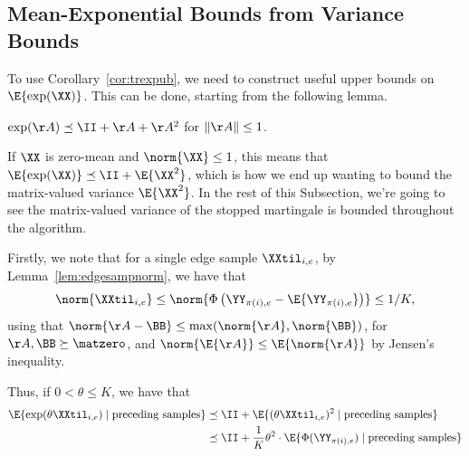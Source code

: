 
\subsection{Mean-Exponential Bounds from Variance Bounds}
To use Corollary~\ref{cor:trexpub}, we need to construct useful upper
bounds on $\E{\exp(\XX)}$.
This can be done, starting from the following lemma.
\begin{lemma}\label{lem:ineq_expagain}
  $\exp(\AA) \preceq \II + \AA + \AA^2$ for $\|\AA\|\leq1$.
\end{lemma}
If $\XX$ is zero-mean and $\norm{\XX} \leq 1$,
this means that $\E{\exp(\XX)} \preceq \II + \E{\XX^2}$,
which is how we end up wanting to bound the matrix-valued variance $\E{\XX^2}$.
In the rest of this Subsection, we're going to see the matrix-valued variance of the stopped
martingale is bounded throughout the algorithm.

Firstly, we note that for a single edge sample $\XXtil_{i,e}$,
by Lemma~\ref{lem:edgesampnorm}, we have that
\[
  \norm{\XXtil_{i,e}} \leq
  \norm{\Phi\left( \YY_{\pi(i),e} - \E{\YY_{\pi(i),e}} \right)}
    \leq 1/K,
\]
using that $\norm{\AA-\BB} \leq \max( \norm{\AA}, \norm{\BB} )$, for
$\AA, \BB \succeq \matzero$, and $\norm{\E{\AA}} \leq \E{\norm{\AA}}$
by Jensen's inequality.

Thus, if $0 < \theta \leq K$, we have that
\begin{align}
  \label{eq:edgelogexp}
  \E{ \exp(\theta \XXtil_{i,e}) \mid \text{preceding samples} }
  &\preceq
      \II +
    \E{(\theta \XXtil_{i,e})^2 \mid \text{preceding samples} }
  \\ \nonumber   &\preceq
        \II +
    \frac{1}{K}\theta^2\cdot
    \E{\Phi(\YY_{\pi(i),e}) \mid \text{preceding samples} }
\end{align}



